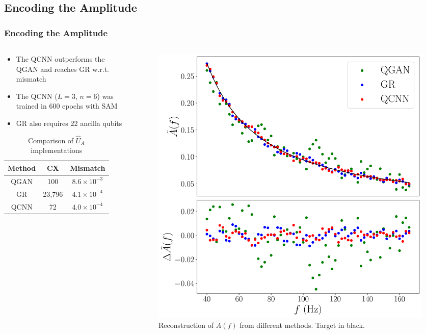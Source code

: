 \documentclass{beamer}
\begin{document}
\subsection{Encoding the Amplitude}
\begin{frame}
\frametitle{Encoding the Amplitude}
\begin{columns}
\begin{column}{0.5\textwidth}
\begin{itemize}
\item The \alert{QCNN outperforms the QGAN} and \alert{reaches GR} w.r.t. mismatch 
\item The QCNN ($L=3$, $n=6$) was trained in 600 epochs with SAM
\item GR also requires 22 ancilla qubits
\end{itemize}
\vspace{0.2cm}
\begin{table}
\centering 
\begin{tabular}{c| c| c}
\textbf{Method} & \textbf{CX} & \textbf{Mismatch}  \\ \hline  
QGAN & 100 & $8.6\times10^{-3}$   \\
GR& 23,796 & $4.1\times 10^{-4}$   \\
QCNN  & 72 & $4.0\times10^{-4}$
\end{tabular}
\caption{Comparison of $\hat{U}_A$ implementations}
\end{table}
\end{column}
\begin{column}{0.5\textwidth} 
\begin{figure}[h]
\centering
\includegraphics[width=\textwidth]{im/amplitude_comp}
\caption{Reconstruction of $\tilde{A}(f)$ from different methods. Target in black.}
\end{figure}
\end{column}
\end{columns}
\end{frame}
\end{document}
